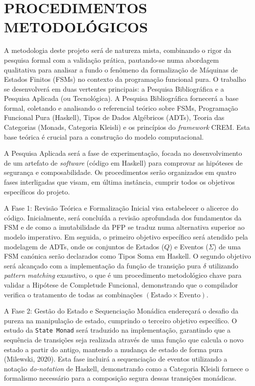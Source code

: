 \documentclass[12pt,a4paper]{article}
\begin{document}
\section{PROCEDIMENTOS METODOLÓGICOS}

A metodologia deste projeto será de natureza mista, combinando o rigor da pesquisa formal com a validação prática, pautando-se numa abordagem qualitativa para analisar a fundo o fenômeno da formalização de Máquinas de Estados Finitos (FSMs) no contexto da programação funcional pura. O trabalho se desenvolverá em duas vertentes principais: a Pesquisa Bibliográfica e a Pesquisa Aplicada (ou Tecnológica). A Pesquisa Bibliográfica fornecerá a base formal, coletando e analisando o referencial teórico sobre FSMs, Programação Funcional Pura (Haskell), Tipos de Dados Algébricos (ADTs), Teoria das Categorias (Monads, Categoria Kleisli) e os princípios do \textit{framework} CREM. Esta base teórica é crucial para a construção do modelo computacional.

A Pesquisa Aplicada será a fase de experimentação, focada no desenvolvimento de um artefato de \textit{software} (código em Haskell) para comprovar as hipóteses de segurança e composabilidade. Os procedimentos serão organizados em quatro fases interligadas que visam, em última instância, cumprir todos os objetivos específicos do projeto.

A Fase 1: Revisão Teórica e Formalização Inicial visa estabelecer o alicerce do código. Inicialmente, será concluída a revisão aprofundada dos fundamentos da FSM e de como a imutabilidade da PFP se traduz numa alternativa superior ao modelo imperativo. Em seguida, o primeiro objetivo específico será atendido pela modelagem de ADTs, onde os conjuntos de Estados ($Q$) e Eventos ($\Sigma$) de uma FSM canónica serão declarados como Tipos Soma em Haskell. O segundo objetivo será alcançado com a implementação da função de transição pura $\delta$ utilizando \textit{pattern matching} exaustivo, o que é um procedimento metodológico chave para validar a Hipótese de Completude Funcional, demonstrando que o compilador verifica o tratamento de todas as combinações $(\text{Estado} \times \text{Evento})$.

A Fase 2: Gestão do Estado e Sequenciação Monádica endereçará o desafio da pureza na manipulação de estado, cumprindo o terceiro objetivo específico. O estudo da \texttt{State Monad} será traduzido na implementação, garantindo que a sequência de transições seja realizada através de uma função que calcula o novo estado a partir do antigo, mantendo a mudança de estado de forma pura (Milewski, 2020). Esta fase incluirá a sequenciação de eventos utilizando a notação \textit{do-notation} de Haskell, demonstrando como a Categoria Kleisli fornece o formalismo necessário para a composição segura dessas transições monádicas.
\end{document}

